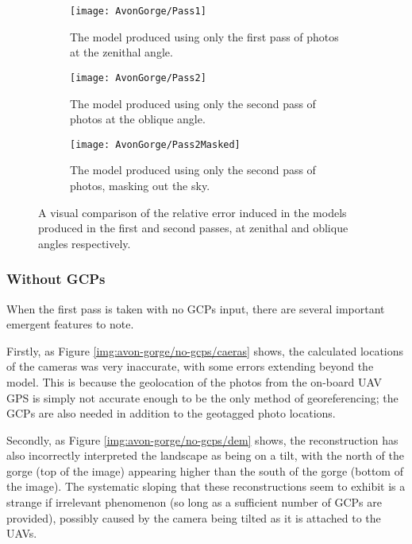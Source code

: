 \begin{figure}
    \centering
    \begin{subfigure}[b]{0.45\textwidth}
        \texttt{[image: AvonGorge/Pass1]}
        \caption{The model produced using only the first pass of photos at the
        zenithal angle.}
        \label{img:avon-gorge/pass-1}
    \end{subfigure}
    \begin{subfigure}[b]{0.45\textwidth}
        \texttt{[image: AvonGorge/Pass2]}
        \caption{The model produced using only the second pass of photos at the
        oblique angle.}
        \label{img:avon-gorge/pass-2}
    \end{subfigure}
    \begin{subfigure}[b]{0.9\textwidth}
        \texttt{[image: AvonGorge/Pass2Masked]}
        \caption{The model produced using only the second pass of photos,
        masking out the sky.}
        \label{img:avon-gorge/pass-2/masked}
    \end{subfigure}
    \caption{A visual comparison of the relative error induced in the models
    produced in the first and second passes, at zenithal and oblique angles
    respectively.}
    \label{img:avon-gorge/passes}
\end{figure}

\subsubsection{Without GCPs}
\label{sec:results/avon-gorge/no-gcps}

When the first pass is taken with no GCPs input, there are several important
emergent features to note.

Firstly, as Figure \ref{img:avon-gorge/no-gcps/caeras} shows, the calculated
locations of the cameras was very inaccurate, with some errors extending beyond
the model. This is because the geolocation of the photos from the on-board UAV
GPS is simply not accurate enough to be the only method of georeferencing; the
GCPs are also needed in addition to the geotagged photo locations.

Secondly, as Figure \ref{img:avon-gorge/no-gcps/dem} shows, the reconstruction
has also incorrectly interpreted the landscape as being on a tilt, with the
north of the gorge (top of the image) appearing higher than the south of the
gorge (bottom of the image). The systematic sloping that these reconstructions
seem to exhibit is a strange if irrelevant phenomenon (so long as a sufficient
number of GCPs are provided), possibly caused by the camera being tilted as it
is attached to the UAVs.

